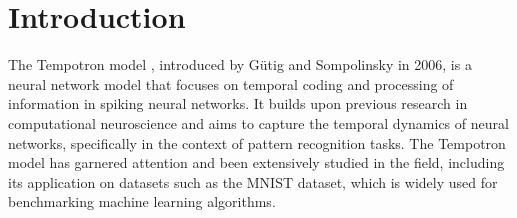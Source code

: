 \chapter{Introduction}
\label{chap:intro}

The Tempotron model \cite{gutig2006tempotron}, introduced by Gütig and Sompolinsky in 2006, is a neural network model that focuses on temporal coding and processing of information in spiking neural networks. It builds upon previous research in computational neuroscience and aims to capture the temporal dynamics of neural networks, specifically in the context of pattern recognition tasks. The Tempotron model has garnered attention and been extensively studied in the field, including its application on datasets such as the MNIST dataset, which is widely used for benchmarking machine learning algorithms.